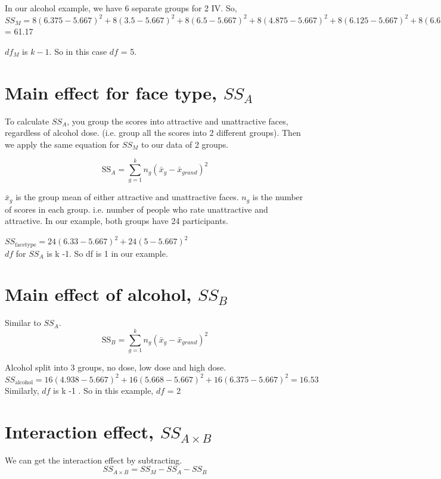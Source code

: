 In our alcohol example, we have 6 separate groups for 2 IV. So, \\

 $SS_M = 8(6.375-5.667)^2 + 8(3.5-5.667)^2 + 8(6.5-5.667)^2 + 8(4.875-5.667)^2 + 8(6.125-5.667)^2 + 8(6.625-5.667)^2$ = 61.17

$df_M$ is $k-1$. So in this case $df$ = 5.

\section{Main effect for face type, $SS_A$}
To calculate $SS_A$, you group the scores into attractive and unattractive faces, regardless of alcohol dose. (i.e. group all the scores into 2 different groups). Then we apply the same equation for $SS_M$ to our data of 2 groups.

\begin{equation}
\text{SS}_A = \sum^k_{g=1} n_g(\bar{x}_g - \bar{x}_{grand})^2
\end{equation}

$\bar{x}_g$ is the group mean of either attractive and unattractive faces. $n_g$ is the number of scores in each group. i.e. number of people who rate unattractive and attractive. In our example, both groups have 24 participants.

$SS_{\text{facetype}} = 24(6.33-5.667)^2 + 24(5-5.667)^2$ \\

$df$ for $SS_A$ is k -1. So df is 1 in our example. 

\section{Main effect of alcohol, $SS_B$}
Similar to $SS_A$.
\begin{equation}
\text{SS}_B = \sum^k_{g=1} n_g(\bar{x}_g - \bar{x}_{grand})^2
\end{equation}

Alcohol split into 3 groups, no dose, low dose and high dose. \\
$SS_{\text{alcohol}} = 16(4.938-5.667)^2+ 16(5.668-5.667)^2 + 16(6.375-5.667)^2 = 16.53 $\\

Similarly, $df$ is k -1 . So in this example, $df$ = 2

\section{Interaction effect, $SS_{A \times B}$}
We can get the interaction effect by subtracting. 
\begin{equation}
SS_{A \times B} = SS_M - SS_A - SS_B
\end{equation}

